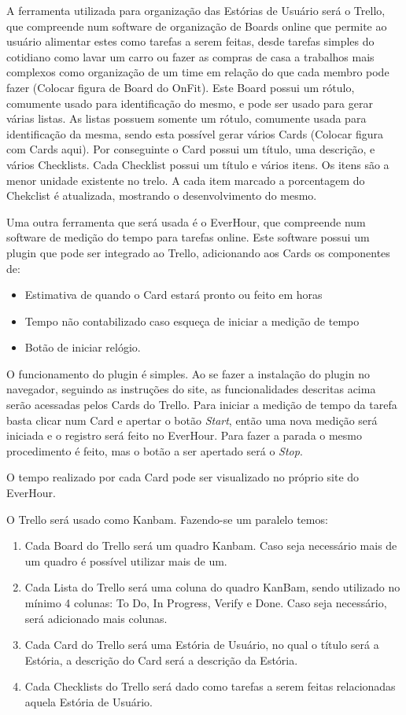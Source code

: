 	A ferramenta utilizada para organização das Estórias de Usuário será o Trello, que compreende num software de organização de Boards online que permite ao usuário alimentar estes como tarefas a serem feitas, desde tarefas simples do cotidiano como lavar um carro ou fazer as compras de casa a trabalhos mais complexos como organização de um time em relação do que cada membro pode fazer (Colocar figura de Board do OnFit). 
	Este Board possui um rótulo, comumente usado para identificação do mesmo, e pode ser usado para gerar várias listas.
	As listas possuem somente um rótulo, comumente usada para identificação da mesma, sendo esta possível gerar vários Cards (Colocar figura com Cards aqui). Por conseguinte o Card possui um título, uma descrição, e vários Checklists.
	Cada Checklist possui um título e vários itens. Os itens são a menor unidade existente no trelo. A cada item marcado a porcentagem do Chekclist é atualizada, mostrando o desenvolvimento do mesmo.
	
	Uma outra ferramenta que será usada é o EverHour, que compreende num software de medição do tempo para tarefas online. Este software possui um plugin que pode ser integrado ao Trello, adicionando aos Cards os componentes de: 
	\begin{itemize}
		\item Estimativa de quando o Card estará pronto ou feito em horas
		\item Tempo não contabilizado caso esqueça de iniciar a medição de tempo
		\item Botão de iniciar relógio.
	\end{itemize} 
	O funcionamento do plugin é simples. Ao se fazer a instalação do plugin no navegador, seguindo as instruções do site, as funcionalidades descritas acima serão acessadas pelos Cards do Trello. Para iniciar a medição de tempo da tarefa basta clicar num Card e apertar o botão \textit{Start}, então uma nova medição será iniciada e o registro será feito no EverHour. Para fazer a parada o mesmo procedimento é feito, mas o botão a ser apertado será o \textit{Stop}.

	O tempo realizado por cada Card pode ser visualizado no próprio site do EverHour.   

	O Trello será usado como Kanbam. Fazendo-se um paralelo temos:
	\begin{enumerate}
		\item Cada Board do Trello será um quadro Kanbam. Caso seja necessário mais de um quadro é possível utilizar mais de um.
		\item Cada Lista do Trello será uma coluna do quadro KanBam, sendo utilizado no mínimo 4 colunas: To Do, In Progress, Verify e Done. Caso seja necessário, será adicionado mais colunas.
		\item Cada Card do Trello será uma Estória de Usuário, no qual o título será a Estória, a descrição do Card será a descrição da Estória.
		\item Cada Checklists do Trello será dado como tarefas a serem feitas relacionadas aquela Estória de Usuário.
	\end{enumerate}

